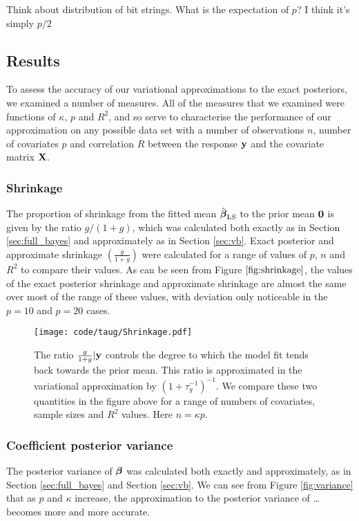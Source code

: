 \documentclass{amsart}[12pt]
\newcommand{\mgc}[1]{{\color{blue}#1}}
\begin{document}
\mgc{Think about distribution of bit strings. What is the expectation of $p$? I think it's simply $p/2$}

\subsection{Results}

To assess the accuracy of our variational approximations to the exact posteriors, we examined a number of
measures. All of the measures that we examined were functions of $\kappa$, $p$ and $R^2$, and so serve to
characterise the performance of our approximation on any possible data set with a number of observations
$n$, number of covariates $p$ and correlation $R$ between the response ${\bf y}$ and the covariate matrix ${\bf X}$.

\subsubsection{Shrinkage}

The proportion of shrinkage from the fitted mean $\hat{{\boldsymbol \beta}}_{\text{LS}}$ to the prior mean ${\bf 0}$ is given by the
ratio $g/(1 + g)$, which was calculated both exactly as in Section \ref{sec:full_bayes} and approximately as
in Section \ref{sec:vb}. Exact posterior and approximate shrinkage $\left( \frac{g}{1 + g} \right)$ were
calculated for a range of values of $p$, $n$ and $R^2$ to compare their values. As can be seen from Figure
$\ref{fig:shrinkage}$, the values of the exact posterior shrinkage and approximate shrinkage are almost the
same over most of the range of these values, with deviation only noticeable in the $p=10$ and $p=20$ cases.

\begin{figure}[p]
	\texttt{[image: code/taug/Shrinkage.pdf]}
	\caption{The ratio $\frac{g}{1 + g} | {\bf y}$ controls the degree to which the model fit tends back towards
		the prior mean. This ratio is approximated in the variational approximation by $(1 + \tau_g^{-1})^{-1}$. We
		compare these two quantities in the figure above for a range of numbers of covariates, sample sizes and $R^2$
		values. Here $n = \kappa p$.}
	\label{fig:shrinkage}
\end{figure}

\subsubsection{Coefficient posterior variance}

The posterior variance of ${\boldsymbol \beta}$ was calculated both exactly and approximately, as in Section
\ref{sec:full_bayes} and Section \ref{sec:vb}. We can see from Figure \ref{fig:variance} that as $p$ and
$\kappa$ increase, the approximation to the posterior variance of \ldots becomes more and more accurate.
\end{document}
